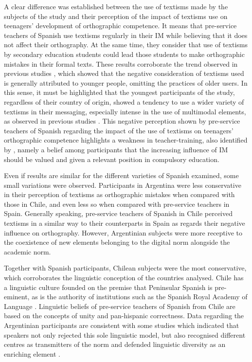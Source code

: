 \documentclass{textolivre}
\begin{document}
A clear difference was established between the use of textisms made by the subjects of the study and their perception of the impact of textisms use on teenagers’ development of orthographic competence. It means that pre-service teachers of Spanish use textisms regularly in their IM while believing that it does not affect their orthography. At the same time, they consider that use of textisms by secondary education students could lead those students to make orthographic mistakes in their formal texts. These results corroborate the trend observed in previous studies \cite{Bouillaud2007, Gomez-Camacho2016, Gomez-Camacho2018, Plester2008, VAZQUEZ-CANO2015}, which showed that the negative consideration of textisms used is generally attributed to younger people, omitting the practices of older users. In this sense, it must be highlighted that the youngest participants of the study, regardless of their country of origin, showed a tendency to use a wider variety of textisms in their messaging, especially intense in the use of multimodal elements, as observed in previous studies \cite{Plester2008, Powell2011, Gomez-Camacho2018}. This negative perception shown by pre-service teachers of Spanish regarding the impact of the use of textisms on teenagers’ orthographic competence highlights a weakness in teacher-training, also identified by \textcite{Cremades2019b}, namely a belief among participants that the increasing influence of IM should be valued and given a relevant position in compulsory education. 

Even if results are similar for the different varieties of Spanish examined, some small variations were observed. Participants in Argentina were less conservative in their perception of textisms as orthographic mistakes when compared with those in Chile, and even less so when compared with pre-service teachers in Spain. Generally speaking, pre-service teachers of Spanish in Chile perceived textisms in a similar way to their counterparts in Spain as regards their negative influence on orthography. However, Argentinian subjects were more receptive to the coexistence of new elements belonging to the digital norm alongside the academic norm. 

Together with Spanish participants, Chilean subjects were the most conservative, which corroborates the linguistic conception of the countries analysed. Chile has a linguistic culture founded on the premise that Peninsular Spanish is pre-eminent, as is the authority of institutions such as the Spanish Royal Academy of Language \cite{Rojas2012}. Linguistic beliefs of pre-service teachers of Spanish from Chile are based on the concepts of unity and pan-hispanic correctness. Data regarding the Argentinian participants are consistent with some studies which indicated that speakers not only rejected this sole linguistic model, but also recognised different centres as transmitters of the norm and defended linguistic diversity as an enriching element \cite{Llull2014, Gutiérrez2018}.
\end{document}
